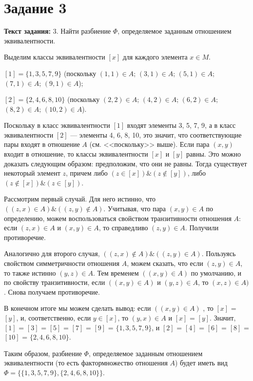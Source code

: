 \documentclass[12pt]{article}
\begin{document}
	\section{Задание 3}
	\label{task3}

	{\bf Текст задания:} 3. Найти разбиение $\Phi$, определяемое заданным отношением эквивалентности.
	
	Выделим классы эквивалентности $[x]$ для каждого элемента $x \in M$.
	
	$[1] = \{1, 3, 5, 7, 9\}$ (поскольку $(1, 1) \in A$; $(3, 1) \in A$; $(5, 1) \in A$; $(7, 1) \in A$; $(9, 1) \in A$);
	
	$[2] = \{2, 4, 6, 8, 10\}$ (поскольку $(2, 2) \in A$; $(4, 2) \in A$; $(6, 2) \in A$; $(8, 2) \in A$; $(10, 2) \in A$).
	
	Поскольку в класс эквивалентности $[1]$ входят элементы 3, 5, 7, 9,  а в класс эквивалентности $[2]$ --- элементы 4, 6, 8, 10, это значит, что соответствующие пары входят в отношение $A$ (см. <<поскольку>> выше). Если пара $(x, y)$ входит в отношение, то классы эквивалентности $[x]$ и $[y]$ равны. Это можно доказать следующим образом: предположим, что они не равны. Тогда существует некоторый элемент $z$, причем либо $(z \in [x]) \& (z \notin [y])$, либо $(z \notin [x]) \& (z\in [y])$. 
	
	Рассмотрим первый случай. Для него истинно, что $((z, x) \in A) \& ((z, y) \notin A)$. Учитывая, что пара $(x, y) \in A$ по определению, можем воспользоваться свойством транзитивности отношения $A$: если $(z, x) \in A$ и $(x, y) \in A$, то справедливо $(z, y) \in A$. Получили противоречие.
	
	Аналогично для второго случая, $((z, x) \notin A) \& ((z, y) \in A)$. Пользуясь свойством симметричности отношения $A$, можем сказать, что если $(z, y) \in A$, то также истинно $(y, z) \in A$. Тем временем $((x, y) \in A)$ по умолчанию, и по свойству транзитивности, если $((x, y) \in A)$ и $(y, z) \in A$, то $(x, z) \in A)$. Снова получаем противоречие.
	
	В конечном итоге мы можем сделать вывод: если $((x, y) \in A)$ , то $[x]$ = $[y]$, и, соответственно, если $y \in [x]$, то $(y, x) \in A$ и $[x]$ = $[y]$. Значит, $[1]$ = $[3]$ = $[5]$ = $[7]$ = $[9]$ = $\{1, 3, 5, 7, 9\}$, и $[2]$ = $[4]$ = $[6]$ = $[8]$ = $[10]$ = $\{2, 4, 6, 8, 10\}$.
	
	Таким образом, разбиение $\Phi$, определяемое заданным отношением эквивалентности (то есть фактормножество отношения $A$) будет иметь вид $\Phi = \{\{1, 3, 5, 7, 9\}, \{2, 4, 6, 8, 10\} \}$.
\end{document}
